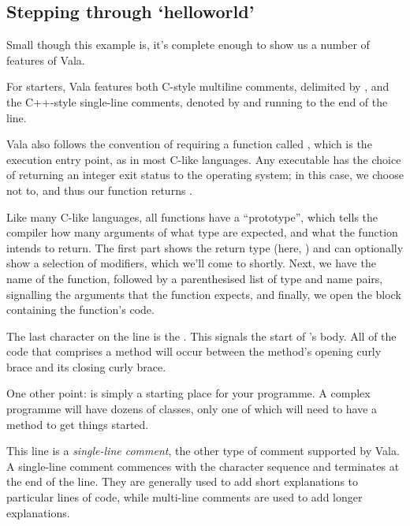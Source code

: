 \subsection{Stepping through `helloworld'}

Small though this example is, it's complete enough to show us a number of
features of Vala.

For starters, Vala features both C-style multiline comments, delimited by
, and the C++-style single-line comments, denoted by
\inlinecode{//} and running to the end of the line.

Vala also follows the convention of requiring a function called ,
which is the execution entry point, as in most C-like languages.  Any
executable has the choice of returning an integer exit status to the operating
system; in this case, we choose not to, and thus our  function
returns .


Like many C-like languages, all functions have a ``prototype'', which tells
the compiler how many arguments of what type are expected, and what the
function intends to return.  The first part shows the return type (here,
) and can optionally show a selection of modifiers, which we'll
come to shortly.  Next, we have the name of the function, followed by a
parenthesised list of type and name pairs, signalling the arguments that the
function expects, and finally, we open the block containing the function's
code.

The last character on the line is the \inlinecode{\{}. This signals the start
of ’s body. All of the code that comprises a method will
occur between the method’s opening curly brace and its closing curly brace.

One other point:  is simply a starting place for your
programme. A complex programme will have dozens of classes, only one of which
will need to have a  method to get things started.


This line is a \emph{single-line comment}, the other type of comment supported by Vala. A single-line comment commences with the character sequence \inlinecode{//} and terminates at the end of the line. They are generally used to add short explanations to particular lines of code, while multi-line  comments are used to add longer explanations.

